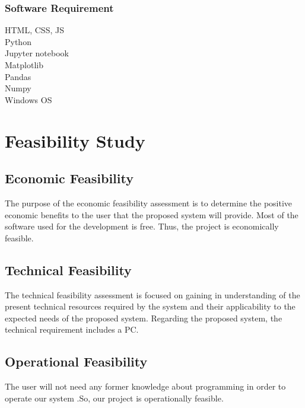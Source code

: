 \subsubsection{Software Requirement}
HTML, CSS, JS\\
Python \\
Jupyter notebook\\
Matplotlib\\
Pandas\\
Numpy\\ 
Windows OS
\section{Feasibility Study}
\subsection{Economic Feasibility}
The purpose of the economic feasibility assessment is to determine the positive       economic benefits to the user that the proposed system will provide. Most of the software used for the development is free. Thus, the project is economically feasible.
\subsection{Technical Feasibility}
The technical feasibility assessment is focused on gaining in understanding of the present technical resources required by the system and their applicability to the expected needs of the proposed system. Regarding the proposed system, the technical requirement includes a PC.
\subsection{Operational Feasibility}
The user will not need any former knowledge about programming in order to operate our system .So, our project is operationally feasible.
